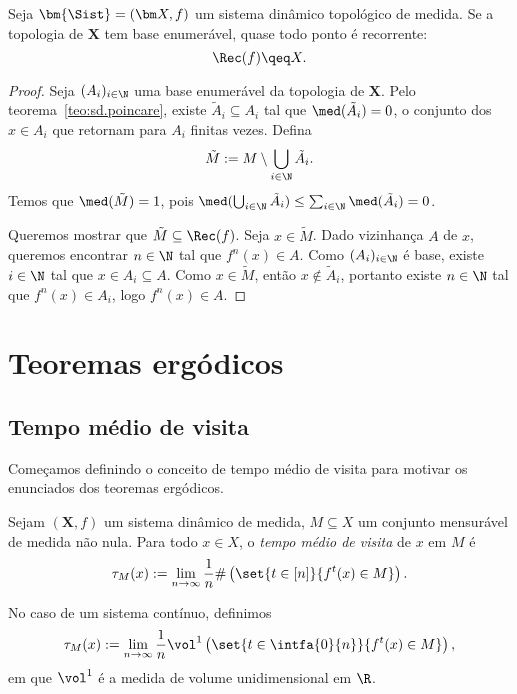 \begin{theorem}
\label{teo:sd.top.poincare}
Seja $\bm{\Sist}=(\bm X,f)$ um sistema dinâmico topológico de medida. Se a topologia de $\bm X$ tem base enumerável, quase todo ponto é recorrente:
	\begin{equation*}
	\Rec(f) \qeq X.
	\end{equation*}
\end{theorem}
\begin{proof}
Seja $(A_i)_{i \in \N}$ uma base enumerável da topologia de $\bm X$. Pelo teorema~\ref{teo:sd.poincare}, existe $\tilde A_i \subseteq A_i$ tal que $\med(\tilde A_i) = 0$, o conjunto dos $x \in A_i$ que retornam para $A_i$ finitas vezes. Defina
	\begin{equation*}
	\tilde M := M \setminus \bigcup_{i \in \N} \tilde A_i.
	\end{equation*}
Temos que $\med(\tilde M) = 1$, pois $\med(\bigcup_{i \in \N} \tilde A_i) \leq \sum_{i \in \N} \med(\tilde A_i) = 0$.

Queremos mostrar que $\tilde M \subseteq \Rec(f)$. Seja $x \in \tilde M$. Dado vizinhança $A$ de $x$, queremos encontrar $n \in \N$ tal que $f^n(x) \in A$. Como $(A_i)_{i \in \N}$ é base, existe $i \in \N$ tal que $x \in A_i \subseteq A$. Como $x \in \tilde M$, então $x \notin \tilde A_i$, portanto existe $n \in \N$ tal que $f^n(x) \in A_i$, logo $f^n(x) \in A$.
\end{proof}





\section{Teoremas ergódicos}

\subsection{Tempo médio de visita}

Começamos definindo o conceito de tempo médio de visita para motivar os enunciados dos teoremas ergódicos.

\begin{definition}
Sejam $(\bm X,f)$ um sistema dinâmico de medida, $M \subseteq X$ um conjunto mensurável de medida não nula. Para todo $x \in X$, o \emph{tempo médio de visita} de $x$ em $M$ é
	\begin{equation*}
	\tau_M(x) := \lim_{n \to \infty} \frac{1}{n} \#\left(\set{t \in [n]}{f^t(x) \in M}\right).
	\end{equation*}

No caso de um sistema contínuo, definimos
	\begin{equation*}
	\tau_M(x) := \lim_{n \to \infty} \frac{1}{n} \vol^1\left(\set{t \in \intfa{0}{n}}{f^t(x) \in M}\right),
	\end{equation*}
em que $\vol^1$ é a medida de volume unidimensional em $\R$.
\end{definition}

